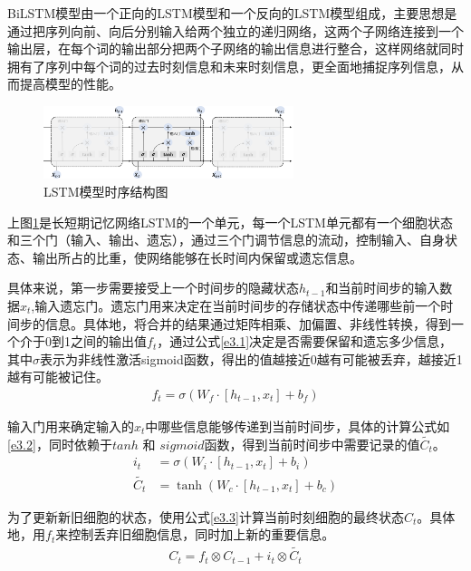 BiLSTM模型由一个正向的LSTM模型和一个反向的LSTM模型组成，主要思想是通过把序列向前、向后分别输入给两个独立的递归网络，这两个子网络连接到一个输出层，在每个词的输出部分把两个子网络的输出信息进行整合，这样网络就同时拥有了序列中每个词的过去时刻信息和未来时刻信息，更全面地捕捉序列信息，从而提高模型的性能。

\begin{figure}[htp]
  \centering
  \includegraphics[width=0.65\textwidth]{figures/LSTM}
  \caption{LSTM模型时序结构图}\label{fig:LSTM}
\end{figure}

上图\ref{fig:LSTM}是长短期记忆网络LSTM的一个单元，每一个LSTM单元都有一个细胞状态和三个门（输入、输出、遗忘），通过三个门调节信息的流动，控制输入、自身状态、输出所占的比重，使网络能够在长时间内保留或遗忘信息。

具体来说，第一步需要接受上一个时间步的隐藏状态$h_{t-1}$和当前时间步的输入数据$x_{t}$,输入遗忘门。遗忘门用来决定在当前时间步的存储状态中传递哪些前一个时间步的信息。具体地，将合并的结果通过矩阵相乘、加偏置、非线性转换，得到一个介于0到1之间的输出值$f_{t}$，通过公式\ref{e3.1}决定是否需要保留和遗忘多少信息，其中$\sigma$表示为非线性激活sigmoid函数，得出的值越接近0越有可能被丢弃，越接近1越有可能被记住。
\begin{equation}\label{e3.1}
  \begin{split}
    f_{t} = \sigma \left(W_{f} \cdot \left[h_{t-1},x_{t}\right] + b_f \right)
  \end{split}
\end{equation}

输入门用来确定输入的$x_{t}$中哪些信息能够传递到当前时间步，具体的计算公式如\ref{e3.2}，同时依赖于$tanh$ 和 $sigmoid$函数，得到当前时间步中需要记录的值$\widetilde{C_t}$。
\begin{equation}\label{e3.2}
  \begin{split}
    i_t &= \sigma \left(W_{i} \cdot \left[h_{t-1},x_{t}\right] + b_i\right)
    \\
    \widetilde{C_t} &= \tanh \left(W_{c} \cdot \left[h_{t-1},x_{t}\right] + b_c \right)
  \end{split}
\end{equation}

为了更新新旧细胞的状态，使用公式\ref{e3.3}计算当前时刻细胞的最终状态$C_t$。具体地，用$f_{t}$来控制丢弃旧细胞信息，同时加上新的重要信息。
\begin{equation}\label{e3.3}
  \begin{split}
   C_t = f_t \otimes C_{t-1} + i_t \otimes \widetilde{C_t}
  \end{split}
\end{equation}

